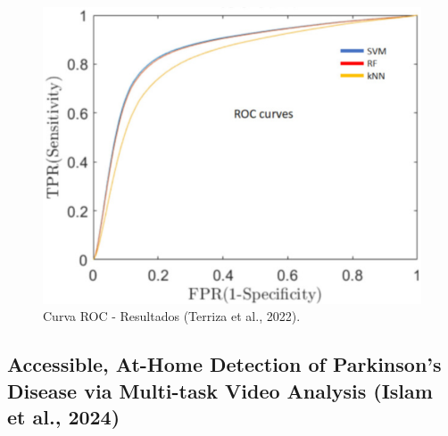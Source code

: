 \documentclass[listof=nochaptergap,12pt,times,authoryear]{report}
\begin{document}
\begin{figure}[H]
    \centering
    \includegraphics[width=\textwidth]{A4 - 2 .png}
    \caption{Curva ROC - Resultados (Terriza et al., 2022).}
    \label{fig:resultados_risa}
\end{figure}

\subsection{Accessible, At-Home Detection of Parkinson’s Disease via Multi-task Video Analysis (Islam et al., 2024)}
\end{document}
